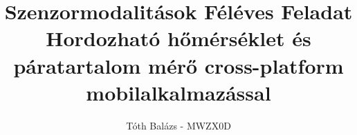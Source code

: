 ﻿\documentclass[12pt]{article}
\begin{document}
\title{Szenzormodalitások Féléves Feladat \\[0.5em] \large Hordozható hőmérséklet és páratartalom mérő cross-platform mobilalkalmazással}
\author{Tóth Balázs - MWZX0D}
\date{}
\maketitle

\clearpage

\tableofcontents

\clearpage



\end{document}
